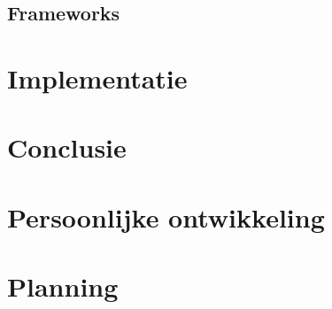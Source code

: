 \documentclass[a4paper,11pt,oneside]{report}
\begin{document}
\begin{lstlisting}
\end{lstlisting}


\section{Frameworks}

\chapter{Implementatie}











\chapter{Conclusie}




\appendix
\chapter{Persoonlijke ontwikkeling}
\lipsum[1]

\chapter{Planning}
  \label{chap:planning}


\newpage

\printglossary


\renewcommand{\bibname}{Bronvermeldingen}



\nocite{*}

\end{document}
